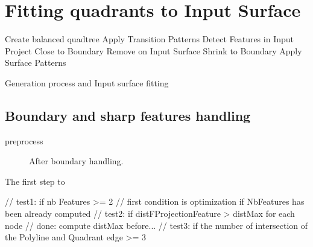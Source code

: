 \documentclass[10pt]{article}
\begin{document}
\section{Fitting quadrants to Input Surface}
\label{sec:method}



\begin{algorithm}[H]

\SetAlgoLined
{}
\nl {}
 \nl Create balanced quadtree\; \label{alg:goto}
 \nl Apply Transition Patterns\;
 \nl Detect Features in Input\;
 Project Close to Boundary\;
 Remove on Input Surface\;
 Shrink to Boundary\;
 \nl Apply Surface Patterns\;
 \caption{Generation process and Input surface fitting}
 \label{alg:surfacefitting}
\end{algorithm}

\subsection{Boundary and sharp features handling}

preprocess

 \begin{figure}[htb]
\centering
\caption{After boundary handling.}
\label{fig:boundary}
\end{figure}

The first step to 

        // test1: if nb Features >= 2
        // first condition is optimization if NbFeatures has been already computed
        // test2: if distFProjectionFeature > distMax for each node
        // done: compute distMax before...
        // test3: if the number of intersection of the Polyline and Quadrant edge >= 3
\end{document}
